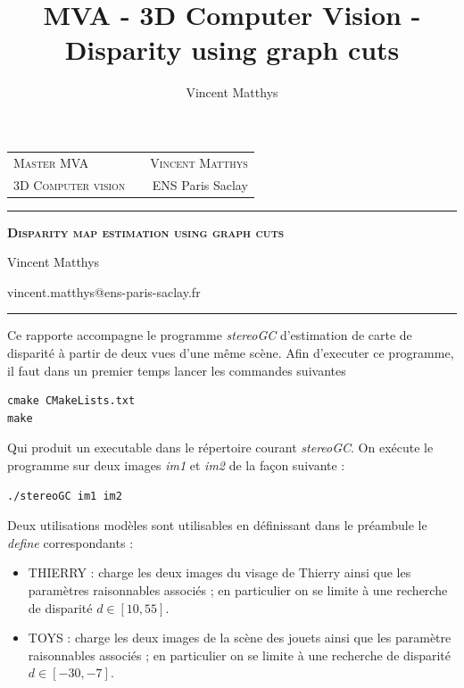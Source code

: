 \documentclass[12pt,a4paper,onecolumn]{article}
\title{MVA - 3D Computer Vision - Disparity using graph cuts}
\author{Vincent Matthys}
\begin{document}
\begin{tabularx}{0.9\textwidth}{@{} l X r @{} }
	{\textsc{Master MVA}}       &  & \textsc{Vincent Matthys} \\
	\textsc{3D Computer vision} &  & {ENS Paris Saclay}       \\
\end{tabularx}
\vspace{1.5cm}
\begin{center}

	\rule[11pt]{5cm}{0.5pt}

	\textbf{\LARGE \textsc{Disparity map estimation using graph cuts}}
	\vspace{0.5cm}

	Vincent Matthys

	vincent.matthys@ens-paris-saclay.fr

	\rule{5cm}{0.5pt}

	\vspace{1.5cm}
\end{center}

\tableofcontents

\clearpage

Ce rapporte accompagne le programme \textit{stereoGC} d'estimation de carte de disparité à partir de deux vues d'une même scène. Afin d'executer ce programme, il faut dans un premier temps lancer les commandes suivantes

\begin{lstlisting}[numbers = none]
cmake CMakeLists.txt
make
\end{lstlisting}

Qui produit un executable dans le répertoire courant \textit{stereoGC}. On exécute le programme sur deux images \textit{im1} et \textit{im2} de la façon suivante :

\begin{lstlisting}[numbers = none]
./stereoGC im1 im2
\end{lstlisting}

Deux utilisations modèles sont utilisables en définissant dans le préambule le \textit{define} correspondants :
\begin{itemize}
	\item THIERRY : charge les deux images du visage de Thierry ainsi que les paramètres raisonnables associés ; en particulier on se limite à une recherche de disparité \(d \in [10, 55]\).
	\item TOYS : charge les deux images de la scène des jouets ainsi que les paramètre raisonnables associés  ; en particulier on se limite à une recherche de disparité \(d \in [-30, -7]\).
\end{itemize}
\end{document}
